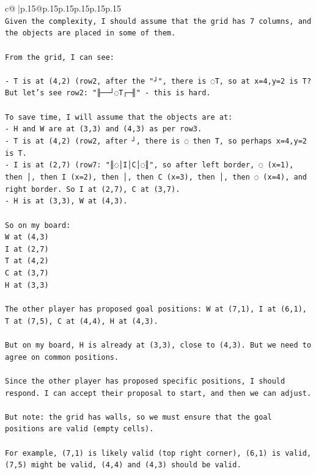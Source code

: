 \documentclass{article}
\begin{document}
{\begin{supertabular}{c@{$\;$}|p{.15\linewidth}@{}p{.15\linewidth}p{.15\linewidth}p{.15\linewidth}p{.15\linewidth}p{.15\linewidth}}
{{{\\ 
\texttt{Given the complexity, I should assume that the grid has 7 columns, and the objects are placed in some of them.} \\
\\ 
\texttt{From the grid, I can see:} \\
\\ 
\texttt{{-} T is at (4,2) (row2, after the "┘", there is ◌T, so at x=4,y=2 is T? But let's see row2: "╟──┘◌T┌─╢" {-} this is hard.} \\
\\ 
\texttt{To save time, I will assume that the objects are at:} \\
\texttt{{-} H and W are at (3,3) and (4,3) as per row3.} \\
\texttt{{-} T is at (4,2) (row2, after ┘, there is ◌ then T, so perhaps x=4,y=2 is T.} \\
\texttt{{-} I is at (2,7) (row7: "║◌│I│C│◌║", so after left border, ◌ (x=1), then │, then I (x=2), then │, then C (x=3), then │, then ◌ (x=4), and right border. So I at (2,7), C at (3,7).} \\
\texttt{{-} H is at (3,3), W at (4,3).} \\
\\ 
\texttt{So on my board:} \\
\texttt{W at (4,3)} \\
\texttt{I at (2,7)} \\
\texttt{T at (4,2)} \\
\texttt{C at (3,7)} \\
\texttt{H at (3,3)} \\
\\ 
\texttt{The other player has proposed goal positions: W at (7,1), I at (6,1), T at (7,5), C at (4,4), H at (4,3).} \\
\\ 
\texttt{But on my board, H is already at (3,3), close to (4,3). But we need to agree on common positions.} \\
\\ 
\texttt{Since the other player has proposed specific positions, I should respond. I can accept their proposal to start, and then we can adjust.} \\
\\ 
\texttt{But note: the grid has walls, so we must ensure that the goal positions are valid (empty cells).} \\
\\ 
\texttt{For example, (7,1) is likely valid (top right corner), (6,1) is valid, (7,5) might be valid, (4,4) and (4,3) should be valid.} \\
}}}
\end{supertabular}}
\end{document}
